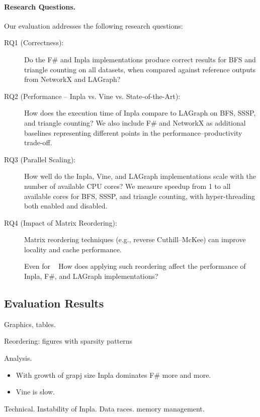 \paragraph{Research Questions.}
Our evaluation addresses the following research questions:

\begin{description}
    \item[RQ1 (Correctness):] Do the F\# and Inpla implementations produce correct results for BFS and triangle counting on all datasets, when compared against reference outputs from NetworkX and LAGraph?

    \item[RQ2 (Performance -- Inpla vs. Vine vs. State-of-the-Art):] How does the execution time of Inpla compare to LAGraph on BFS, SSSP, and triangle counting?
         We also include F\# and NetworkX as additional baselines representing different points in the performance--productivity trade-off.

    \item[RQ3 (Parallel Scaling):] How well do the Inpla, Vine, and LAGraph implementations scale with the number of available CPU cores?
          We measure speedup from 1 to all available cores for BFS, SSSP, and triangle counting, with hyper-threading both enabled and disabled.

    \item[RQ4 (Impact of Matrix Reordering):] Matrix reordering techniques (e.g., reverse Cuthill--McKee) can improve locality and cache performance.
    \item[] Even for ~\cite{10.1145/3731599.3767441}
          How does applying such reordering affect the performance of Inpla, F\#, and LAGraph implementations?
\end{description}

\subsection{Evaluation Results}

Graphics, tables.

Reordering: figures with sparsity patterns 

Analysis.
\begin{itemize}
    \item With growth of grapj size Inpla dominates F\# more and more.
    \item Vine is slow. 
\end{itemize}

Technical. Instability of Inpla. Data races. memory management. 